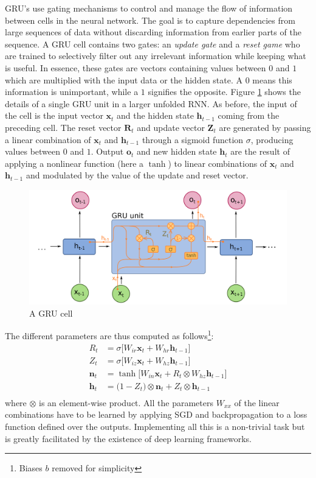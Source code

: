 GRU's use gating mechanisms to control and manage the flow of information between cells in the neural network. The goal is to capture dependencies from large sequences of data without discarding information from earlier parts of the sequence. A GRU cell contains two gates: an \emph{update gate} and a \emph{reset game} who are trained to selectively filter out any irrelevant information while keeping what is useful. In essence, these gates are vectors containing values between $0$ and $1$ which are multiplied with the input data or the hidden state. A $0$ means this information is unimportant, while a $1$ signifies the opposite. Figure \ref{fig:gru_cell} shows the details of a single GRU unit in a larger unfolded RNN. As before, the input of the cell is the input vector $\bm{x}_t$ and the hidden state $\bm{h}_{t-1}$ coming from the preceding cell. The reset vector $\bm{R}_t$ and update vector $\bm{Z}_t$ are generated by passing a linear combination of $\bm{x}_t$ and $\bm{h}_{t-1}$ through a sigmoid function $\sigma$, producing values between $0$ and $1$. Output $\bm{o}_t$ and new hidden state $\bm{h}_t$ are the result of applying a nonlinear function (here a $\tanh$) to linear combinations of $\bm{x}_t$ and $\bm{h}_{t-1}$ and modulated by the value of the update and reset vector.\\

\begin{figure}[htp]
    \centering
    \includegraphics[width=14cm]{images/gru.png}
    \caption{A GRU cell}
    \label{fig:gru_cell}
\end{figure}

The different parameters are thus computed as follows\footnote{Biases $b$ removed for simplicity}:
\begin{align*}
        R_t &= \sigma\Big [ W_{ir} \bm{x}_t + W_{hr} \bm{h}_{t-1} \Big ] \\
        Z_t &= \sigma \Big [ W_{iz} \bm{x}_t + W_{hz} \bm{h}_{t-1} \Big ] \\
        \bm{n}_t &= \tanh \Big [ W_{in} \bm{x}_t + R_t \otimes W_{hz} \bm{h}_{t-1} \Big ] \\
        \bm{h}_t &= \big ( 1-Z_t \big ) \otimes \bm{n}_t + Z_t \otimes \bm{h}_{t-1} \\
\end{align*}
where $\otimes$ is an element-wise product. All the parameters $W_{xx}$ of the linear combinations have to be learned by applying SGD and backpropagation to a loss function defined over the outputs. Implementing all this is a non-trivial task but is greatly facilitated by the existence of deep learning frameworks.\\

